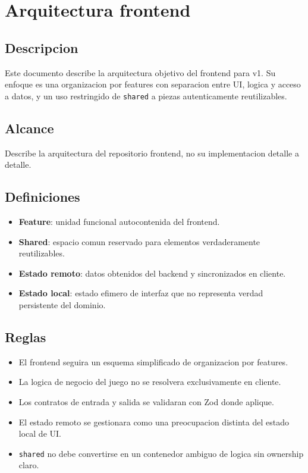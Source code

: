 \section{Arquitectura frontend}

\subsection{Descripcion}

Este documento describe la arquitectura objetivo del frontend para v1. Su enfoque es una organizacion por features con separacion entre UI, logica y acceso a datos, y un uso restringido de \texttt{shared} a piezas autenticamente reutilizables.

\subsection{Alcance}

Describe la arquitectura del repositorio frontend, no su implementacion detalle a detalle.

\subsection{Definiciones}

\begin{itemize}
  \item \textbf{Feature}: unidad funcional autocontenida del frontend.
  \item \textbf{Shared}: espacio comun reservado para elementos verdaderamente reutilizables.
  \item \textbf{Estado remoto}: datos obtenidos del backend y sincronizados en cliente.
  \item \textbf{Estado local}: estado efimero de interfaz que no representa verdad persistente del dominio.
\end{itemize}

\subsection{Reglas}

\begin{itemize}
  \item El frontend seguira un esquema simplificado de organizacion por features.
  \item La logica de negocio del juego no se resolvera exclusivamente en cliente.
  \item Los contratos de entrada y salida se validaran con Zod donde aplique.
  \item El estado remoto se gestionara como una preocupacion distinta del estado local de UI.
  \item \texttt{shared} no debe convertirse en un contenedor ambiguo de logica sin ownership claro.
\end{itemize}

